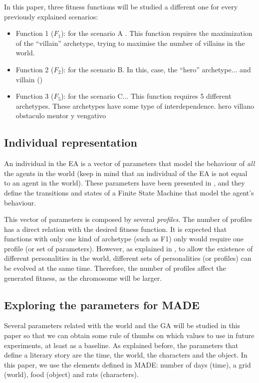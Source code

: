 \documentclass[runningheads,a4paper]{llncs}
\begin{document}
In this paper, three fitness functions will be studied a different one
for every previously explained scenarios:
\begin{itemize}
\item Function 1 ($F_1$): for the scenario A . This function requires the maximization of the ``villain'' archetype, trying to maximise the number of villains in the world. 
\item Function 2 ($F_2$): for the scenario B. In this, case, the ``hero'' archetype... and villain ()
\item Function 3 ($F_5$): for the scenario C... This function requires 5 different archetypes. These archetypes have some type of interdependence. hero villano obstaculo mentor y vengativo %
\end{itemize}

\subsection{Individual representation}

An individual in the EA is a vector of parameters that model the
behaviour of {\em all} the agents in the world (keep in mind that an
individual of the EA is not equal to an agent in the world). These
parameters have been presented in \cite{garcia14my}, and they define
the transitions and states of a Finite State Machine that model the
agent's behaviour. %

This vector of parameters is composed by several {\em profiles}. The number of profiles has a direct relation with the desired fitness function. It is expected that functions with only one kind of archetype (such as F1) only would require one profile (or set of parameters). However, as explained in \cite{garcia14my}, to allow the existence of different personalities in the world, different sets of personalities (or profiles) can be evolved at the same time. Therefore, the number of profiles affect the generated fitness, as the chromosome will be larger. 


\subsection{Exploring the parameters for MADE}


Several parameters related with the world and the GA will be studied
in this paper so that we can obtain some rule of thumbs on which
values to use in future experiments, at least as a baseline. As
explained before, the parameters that define a literary story are the
time, the world, the characters and the object. In this paper, we use
the elements defined in MADE: number of days (time), a grid (world),
food (object) and rats (characters). 
\end{document}
